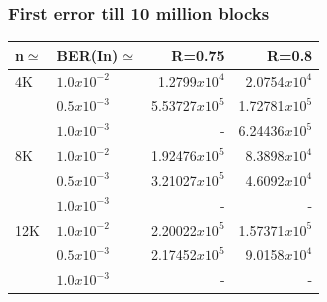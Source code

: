 \documentclass[xcolor=dvipsname]
{beamer}
\begin{document}
\begin{frame}[t] 
\frametitle{First error till 10 million blocks}

\begin{table}[]
\centering
\begin{tabular}{|l|l|r|r|}
\hline
n$\simeq$   & BER(In)$\simeq$    & R=0.75  & R=0.8  \\ \hline
4K  & $1.0x10^{-2}$  &  1.2799$x10^{4}$    & 2.0754$x10^{4}$           \\ 
    & $0.5x10^{-3}$  &  5.53727$x10^{5}$    &  1.72781$x10^{5}$       \\ 
    & $1.0x10^{-3}$   & -				   & 6.24436$x10^{5}$       \\ \hline
8K  & $1.0x10^{-2}$   & 1.92476$x10^{5}$   & 8.3898$x10^{4}$        \\ 
    & $0.5x10^{-3}$   & 3.21027$x10^{5}$     & 4.6092$x10^{4}$        \\ 
    & $1.0x10^{-3}$   & -				   & -                 \\ \hline
12K & $1.0x10^{-2}$   & 2.20022$x10^{5}$   & 1.57371$x10^{5}$          \\ 
    & $0.5x10^{-3}$   & 2.17452$x10^{5}$     & 9.0158$x10^{4}$        \\ 
    & $1.0x10^{-3}$   & -				     & -        \\ \hline   
\end{tabular}
\end{table}

\end{frame}
\end{document}

